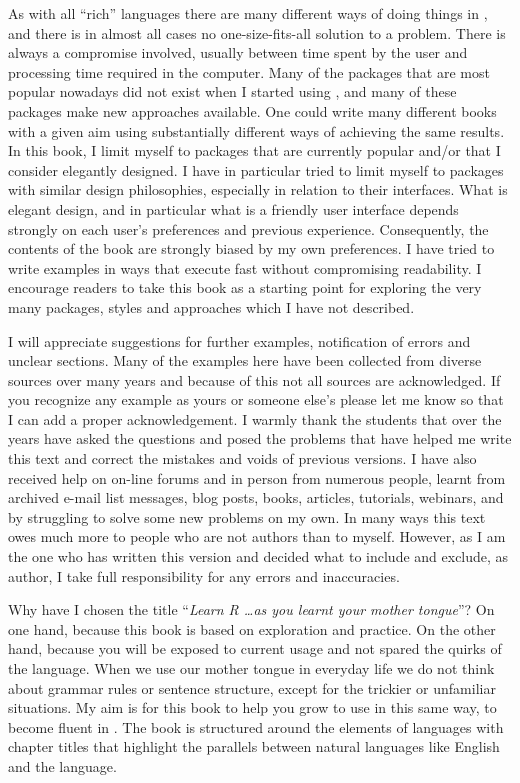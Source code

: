 As with all ``rich'' languages there are many different ways of doing things in \Rlang, and there is in almost all cases no one-size-fits-all solution to a problem. There is always a compromise involved, usually between time spent by the user and processing time required in the computer. Many of the packages that are most popular nowadays did not exist when I started using \Rlang, and many of these packages make new approaches available. One could write many different \Rlang books with a given aim using substantially different ways of achieving the same results. In this book, I limit myself to packages that are currently popular and/or that I consider elegantly designed. I have in particular tried to limit myself to packages with similar design philosophies, especially in relation to their interfaces. What is elegant design, and in particular what is a friendly user interface depends strongly on each user's preferences and previous experience. Consequently, the contents of the book are strongly biased by my own preferences. I have tried to write examples in ways that execute fast without compromising readability. I encourage readers to take this book as a starting point for exploring the very many packages, styles and approaches which I have not described.

I will appreciate suggestions for further examples, notification of errors and unclear sections. Many of the examples here have been collected from diverse sources over many years and because of this not all sources are acknowledged. If you recognize any example as yours or someone else's please let me know so that I can add a proper acknowledgement. I warmly thank the students that over the years have asked the questions and posed the problems that have helped me write this text and correct the mistakes and voids of previous versions. I have also received help on on-line forums and in person from numerous people, learnt from archived e-mail list messages, blog posts, books, articles, tutorials, webinars, and by struggling to solve some new problems on my own. In many ways this text owes much more to people who are not authors than to myself. However, as I am the one who has written this version and decided what to include and exclude, as author, I take full responsibility for any errors and inaccuracies.

Why have I chosen the title ``\emph{Learn R \ldots as you learnt your mother tongue}''? On one hand, because this book is based on exploration and practice. On the other hand, because you will be exposed to current usage and not spared the quirks of the language. When we use our mother tongue in everyday life we do not think about grammar rules or sentence structure, except for the trickier or unfamiliar situations. My aim is for this book to help you grow to use \Rlang in this same way, to become fluent in \Rlang. The book is structured around the elements of languages with chapter titles that highlight the parallels between natural languages like English and the \Rlang language.

